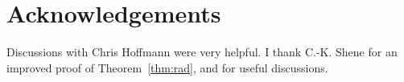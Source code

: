 
\section{Acknowledgements}

Discussions with Chris Hoffmann were very helpful.
I thank C.-K. Shene for an improved proof of Theorem~\ref{thm:rad},
and for useful discussions.





